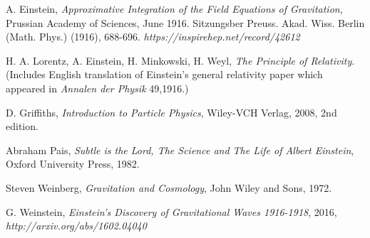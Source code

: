 \documentclass[12pt,reqno]{amsart}
\theoremstyle{definition}
\numberwithin{equation}{section}
\begin{document}
\begin{thebibliography}{10}

A. Einstein, \emph{Approximative Integration of the Field Equations of Gravitation}, Prussian  Academy  of Sciences, June 1916. Sitzungsber Preuss. Akad. Wiss. Berlin (Math. Phys.) (1916), 688-696. 
{\it\Small https://inspirehep.net/record/42612}


H. A. Lorentz, A. Einstein, H. Minkowski, H. Weyl, \emph{The Principle of Relativity}. (Includes English translation of Einstein's general relativity paper which appeared in {\it Annalen der Physik} 49,1916.)

D. Griffiths, \emph{Introduction to Particle Physics}, Wiley-VCH Verlag, 2008, 2nd edition.




Abraham Pais, \emph{Subtle is the Lord, The Science and The Life of Albert Einstein}, Oxford University Press, 1982.



Steven Weinberg, \emph{Gravitation and Cosmology}, John Wiley and Sons, 1972.

G. Weinstein, \emph{Einstein's Discovery of Gravitational Waves 1916-1918}, 2016, {\it\Small http://arxiv.org/abs/1602.04040}



\end{thebibliography}


\end{document}
